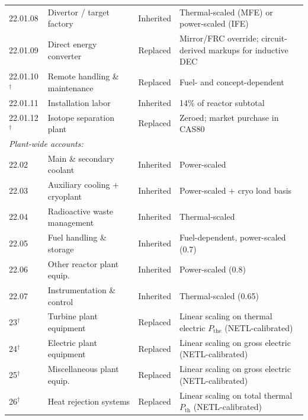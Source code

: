 \documentclass{article}
\begin{document}
\begin{table}[htbp]
\begin{tabular}{llcp{6.0cm}}
\hspace{1em}22.01.08 & Divertor / target factory & Inherited & Thermal-scaled (MFE) or power-scaled (IFE) \\
\hspace{1em}22.01.09 & Direct energy converter & Replaced & Mirror/FRC override; circuit-derived markups for inductive DEC \\
\hspace{1em}22.01.10$^\dagger$ & Remote handling \& maintenance & Replaced & Fuel- and concept-dependent \\
\hspace{1em}22.01.11 & Installation labor & Inherited & 14\% of reactor subtotal \\
\hspace{1em}22.01.12$^\dagger$ & Isotope separation plant & Replaced & Zeroed; market purchase in CAS80 \\
\multicolumn{4}{l}{\textit{Plant-wide accounts:}} \\
\hspace{1em}22.02 & Main \& secondary coolant & Inherited & Power-scaled \\
\hspace{1em}22.03 & Auxiliary cooling + cryoplant & Inherited & Power-scaled + cryo load basis \\
\hspace{1em}22.04 & Radioactive waste management & Inherited & Thermal-scaled \\
\hspace{1em}22.05 & Fuel handling \& storage & Inherited & Fuel-dependent, power-scaled (0.7) \\
\hspace{1em}22.06 & Other reactor plant equip.\ & Inherited & Power-scaled (0.8) \\
\hspace{1em}22.07 & Instrumentation \& control & Inherited & Thermal-scaled (0.65) \\
23$^\dagger$ & Turbine plant equipment & Replaced & Linear scaling on thermal electric $P_{\text{the}}$ (NETL-calibrated) \\
24$^\dagger$ & Electric plant equipment & Replaced & Linear scaling on gross electric (NETL-calibrated) \\
25$^\dagger$ & Miscellaneous plant equip.\ & Replaced & Linear scaling on gross electric (NETL-calibrated) \\
26$^\dagger$ & Heat rejection systems & Replaced & Linear scaling on total thermal $P_{\text{th}}$ (NETL-calibrated) \\

\end{tabular}
\end{table}
\end{document}
